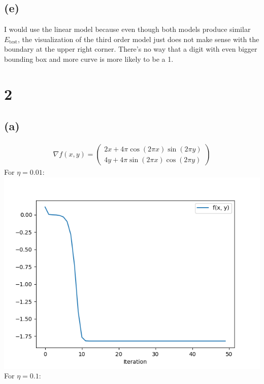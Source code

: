 \documentclass{article}
\begin{document}
		\subsection*{(e)}
			I would use the linear model because even though both models produce similar $E_{\text{test}}$, the visualization of the third order model just does not make sense with the boundary at the upper right corner. There's no way that a digit with even bigger bounding box and more curve is more likely to be a 1.
			
	\section*{2}
	\subsection*{(a)}
		\begin{align*}
			\nabla f(x, y) =
			\begin{pmatrix}
				2x + 4\pi \cos (2\pi x)\sin (2\pi y)\\
				4y + 4\pi \sin (2\pi x)\cos (2\pi y)
			\end{pmatrix}
		\end{align*}
		For $\eta = 0.01$:\\
		\includegraphics[scale=0.7]{2a1.png}\\
		For $\eta = 0.1$:\\
\end{document}
